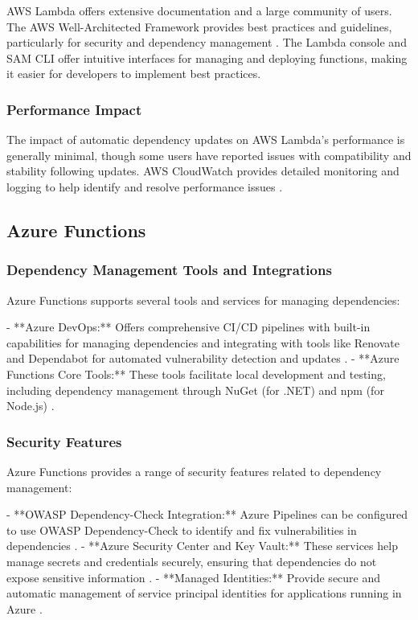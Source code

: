 \documentclass[sigconf]{acmart}
\begin{document}
AWS Lambda offers extensive documentation and a large community of users. The AWS Well-Architected Framework provides best practices and guidelines, particularly for security and dependency management \cite{awsWell2023}. The Lambda console and SAM CLI offer intuitive interfaces for managing and deploying functions, making it easier for developers to implement best practices.

\subsubsection{Performance Impact}

The impact of automatic dependency updates on AWS Lambda's performance is generally minimal, though some users have reported issues with compatibility and stability following updates. AWS CloudWatch provides detailed monitoring and logging to help identify and resolve performance issues \cite{lambdaPerformance2023}.

\subsection{Azure Functions}

\subsubsection{Dependency Management Tools and Integrations}

Azure Functions supports several tools and services for managing dependencies:

- **Azure DevOps:** Offers comprehensive CI/CD pipelines with built-in capabilities for managing dependencies and integrating with tools like Renovate and Dependabot for automated vulnerability detection and updates \cite{azureDevOps2023}.
- **Azure Functions Core Tools:** These tools facilitate local development and testing, including dependency management through NuGet (for .NET) and npm (for Node.js) \cite{azureCoreTools2023}.

\subsubsection{Security Features}

Azure Functions provides a range of security features related to dependency management:

- **OWASP Dependency-Check Integration:** Azure Pipelines can be configured to use OWASP Dependency-Check to identify and fix vulnerabilities in dependencies \cite{azureowasp2023}.
- **Azure Security Center and Key Vault:** These services help manage secrets and credentials securely, ensuring that dependencies do not expose sensitive information \cite{azureSecurity2023}.
- **Managed Identities:** Provide secure and automatic management of service principal identities for applications running in Azure \cite{azureManagedIdentities2023}.
\end{document}
